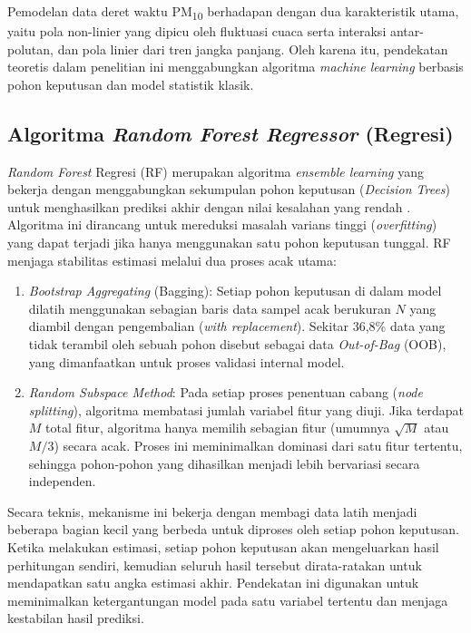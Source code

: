 Pemodelan data deret waktu PM\textsubscript{10} berhadapan dengan dua karakteristik utama, yaitu pola non-linier yang dipicu oleh fluktuasi cuaca serta interaksi antar-polutan, dan pola linier dari tren jangka panjang. Oleh karena itu, pendekatan teoretis dalam penelitian ini menggabungkan algoritma \textit{machine learning} berbasis pohon keputusan dan model statistik klasik.

\newpage

\subsection{Algoritma \textit{Random Forest Regressor} (Regresi)}

\textit{Random Forest} Regresi (RF) merupakan algoritma \textit{ensemble learning} yang bekerja dengan menggabungkan sekumpulan pohon keputusan (\textit{Decision Trees}) untuk menghasilkan prediksi akhir dengan nilai kesalahan yang rendah \autocite{alarsy2025pm25, abdallah2025predicting}. Algoritma ini dirancang untuk mereduksi masalah varians tinggi (\textit{overfitting}) yang dapat terjadi jika hanya menggunakan satu pohon keputusan tunggal. RF menjaga stabilitas estimasi melalui dua proses acak utama:

\begin{enumerate}
   \item {\textit{Bootstrap Aggregating} (Bagging):} Setiap pohon keputusan di dalam model dilatih menggunakan sebagian baris data sampel acak berukuran $N$ yang diambil dengan pengembalian (\textit{with replacement}). Sekitar 36,8\% data yang tidak terambil oleh sebuah pohon disebut sebagai data \textit{Out-of-Bag} (OOB), yang dimanfaatkan untuk proses validasi internal model.
   \item {\textit{Random Subspace Method}:} Pada setiap proses penentuan cabang (\textit{node splitting}), algoritma membatasi jumlah variabel fitur yang diuji. Jika terdapat $M$ total fitur, algoritma hanya memilih sebagian fitur (umumnya $\sqrt{M}$ atau $M/3$) secara acak. Proses ini meminimalkan dominasi dari satu fitur tertentu, sehingga pohon-pohon yang dihasilkan menjadi lebih bervariasi secara independen.
\end{enumerate}

Secara teknis, mekanisme ini bekerja dengan membagi data latih menjadi beberapa bagian kecil yang berbeda untuk diproses oleh setiap pohon keputusan. Ketika melakukan estimasi, setiap pohon keputusan akan mengeluarkan hasil perhitungan sendiri, kemudian seluruh hasil tersebut dirata-ratakan untuk mendapatkan satu angka estimasi akhir. Pendekatan ini digunakan untuk meminimalkan ketergantungan model pada satu variabel tertentu dan menjaga kestabilan hasil prediksi.

